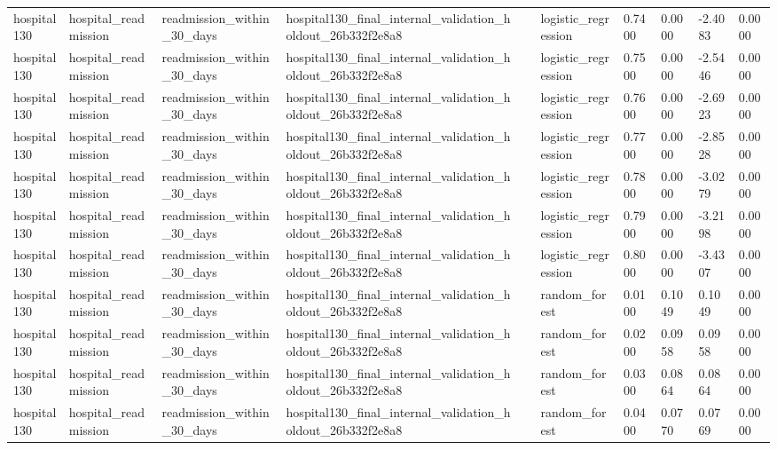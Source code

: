 \begin{tabular}{llllllllll}
hospital130 & hospital\_readmission & readmission\_within\_30\_days & hospital130\_final\_internal\_validation\_holdout\_26b332f2e8a8 &  & logistic\_regression & 0.7400 & 0.0000 & -2.4083 & 0.0000 \\
hospital130 & hospital\_readmission & readmission\_within\_30\_days & hospital130\_final\_internal\_validation\_holdout\_26b332f2e8a8 &  & logistic\_regression & 0.7500 & 0.0000 & -2.5446 & 0.0000 \\
hospital130 & hospital\_readmission & readmission\_within\_30\_days & hospital130\_final\_internal\_validation\_holdout\_26b332f2e8a8 &  & logistic\_regression & 0.7600 & 0.0000 & -2.6923 & 0.0000 \\
hospital130 & hospital\_readmission & readmission\_within\_30\_days & hospital130\_final\_internal\_validation\_holdout\_26b332f2e8a8 &  & logistic\_regression & 0.7700 & 0.0000 & -2.8528 & 0.0000 \\
hospital130 & hospital\_readmission & readmission\_within\_30\_days & hospital130\_final\_internal\_validation\_holdout\_26b332f2e8a8 &  & logistic\_regression & 0.7800 & 0.0000 & -3.0279 & 0.0000 \\
hospital130 & hospital\_readmission & readmission\_within\_30\_days & hospital130\_final\_internal\_validation\_holdout\_26b332f2e8a8 &  & logistic\_regression & 0.7900 & 0.0000 & -3.2198 & 0.0000 \\
hospital130 & hospital\_readmission & readmission\_within\_30\_days & hospital130\_final\_internal\_validation\_holdout\_26b332f2e8a8 &  & logistic\_regression & 0.8000 & 0.0000 & -3.4307 & 0.0000 \\
hospital130 & hospital\_readmission & readmission\_within\_30\_days & hospital130\_final\_internal\_validation\_holdout\_26b332f2e8a8 &  & random\_forest & 0.0100 & 0.1049 & 0.1049 & 0.0000 \\
hospital130 & hospital\_readmission & readmission\_within\_30\_days & hospital130\_final\_internal\_validation\_holdout\_26b332f2e8a8 &  & random\_forest & 0.0200 & 0.0958 & 0.0958 & 0.0000 \\
hospital130 & hospital\_readmission & readmission\_within\_30\_days & hospital130\_final\_internal\_validation\_holdout\_26b332f2e8a8 &  & random\_forest & 0.0300 & 0.0864 & 0.0864 & 0.0000 \\
hospital130 & hospital\_readmission & readmission\_within\_30\_days & hospital130\_final\_internal\_validation\_holdout\_26b332f2e8a8 &  & random\_forest & 0.0400 & 0.0770 & 0.0769 & 0.0000 \\

\end{tabular}

